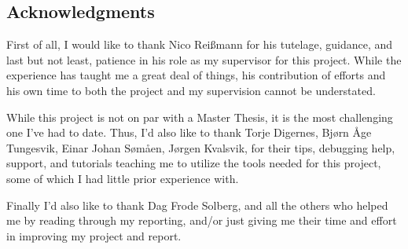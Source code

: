 \subsection{Acknowledgments}

First of all, I would like to thank Nico Rei\ss mann for his tutelage, guidance,
and last but not least, patience in his role as my supervisor for this project.
While the experience has taught me a great deal of things, his contribution of
efforts and his own time to both the project and my supervision cannot be
understated.

While this project is not on par with a Master Thesis, it is the most
challenging one I've had to date. Thus, I'd also like to thank Torje Digernes,
Bj\o rn \AA ge Tungesvik, Einar Johan S\o m\aa en, J\o rgen Kvalsvik, for their
tips, debugging help, support, and tutorials teaching me to utilize the tools
needed for this project, some of which I had little prior experience with.

Finally I'd also like to thank Dag Frode Solberg, and all the others who helped
me by reading through my reporting, and/or just giving me their time and effort
in improving my project and report.
